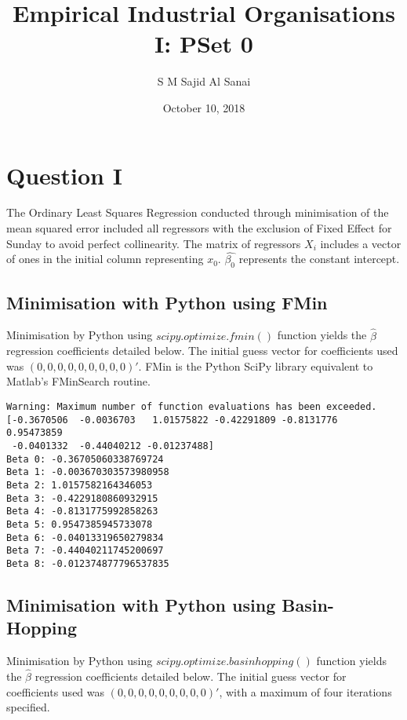 \documentclass{article}
\title{Empirical Industrial Organisations I: PSet 0}
\author{S M Sajid Al Sanai}
\date{October 10, 2018}
\begin{document}
\maketitle
{}
\tableofcontents


\newpage
\section{Question I}
The Ordinary Least Squares Regression conducted through minimisation of the mean squared error included all regressors with the exclusion of Fixed Effect for Sunday to avoid perfect collinearity. The matrix of regressors $X_i$ includes a vector of ones in the initial column representing $x_0$. $\hat{\beta_0}$ represents the constant intercept.

\subsection{Minimisation with Python using FMin}
Minimisation by Python using $scipy.optimize.fmin()$ function yields the $\hat{\beta}$ regression coefficients detailed below. The initial guess vector for coefficients used was $(0, 0, 0, 0, 0, 0, 0, 0, 0)'$. FMin is the Python SciPy library equivalent to Matlab's FMinSearch routine.

\begin{lstlisting}
Warning: Maximum number of function evaluations has been exceeded.
[-0.3670506  -0.0036703   1.01575822 -0.42291809 -0.8131776   0.95473859
 -0.0401332  -0.44040212 -0.01237488]
Beta 0: -0.36705060338769724
Beta 1: -0.003670303573980958
Beta 2: 1.0157582164346053
Beta 3: -0.4229180860932915
Beta 4: -0.8131775992858263
Beta 5: 0.9547385945733078
Beta 6: -0.04013319650279834
Beta 7: -0.44040211745200697
Beta 8: -0.012374877796537835
\end{lstlisting}

\subsection{Minimisation with Python using Basin-Hopping}
Minimisation by Python using $scipy.optimize.basinhopping()$ function yields the $\hat{\beta}$ regression coefficients detailed below. The initial guess vector for coefficients used was $(0, 0, 0, 0, 0, 0, 0, 0, 0)'$, with a maximum of four iterations specified.
\end{document}
